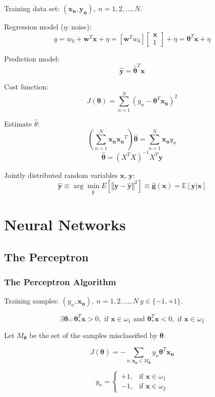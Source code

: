 \documentclass{report}
\begin{document}
Training data set: $(\symbf{x_n}, \symbf{y_n}),\ n=1, 2, \ldots, N$.

Regression model ($\eta$: noise):
\[y = w_0 + \symbf{w}^T \symbf{x} + \eta = [\symbf{w}^T w_0] \begin{bmatrix}\symbf{x} \\
1\end{bmatrix} + \eta = \symbf{\theta}^T \symbf{x} + \eta\]

Prediction model:
\[\symbf{\hat y} = \symbf{\hat \theta}^T \symbf{x}\]

Cost function:
\[J(\symbf{\theta}) = \sum_{n=1}^N (y_n - \symbf{\theta}^T \symbf{x_n})^2 \]

Estimate $\hat \theta$:
\[\left( \sum_{n=1}^N \symbf{x_n}\symbf{x_n}^T \right) \symbf{\hat \theta} = \sum_{n=1}^N \symbf{x_n} y_n\]
\[\symbf{\hat \theta} = (X^T X)^{-1} X^T \symbf{y}\]

Jointly distributed random variables $\symbf{x}$, $\symbf{y}$:
\[\symbf{\hat y} \equiv \arg\min_{\symbf{\hat y}} E\left[ \left\Vert \symbf{y} - \symbf{\hat y} \right\Vert^2 \right] \equiv \symbf{\hat g}(\symbf{x}) = \mathbb{E}[\symbf{y} | \symbf{x}]\]


\chapter{Neural Networks}

\section*{The Perceptron}

\subsection*{The Perceptron Algorithm}

Training samples: $(y_n, \symbf{x_n}),\ n=1, 2, \ldots, N\ y \in \{-1, +1\}$.

\[\exists \symbf{\theta}_*: \symbf{\theta}_*^T \symbf{x} > 0,\text{ if }\symbf{x} \in \omega_1\text{ and }\symbf{\theta}_*^T \symbf{x} < 0,\text{ if }\symbf{x} \in \omega_2\]

Let $M_{\symbf{\theta}}$ be the set of the samples misclassified by $\symbf{\theta}$.

\[J(\symbf{\theta}) = - \sum_{n: \symbf{x_n} \in M_{\symbf{\theta}}} y_n \symbf{\theta}^T \symbf{x_n}\]

\[y_n = \begin{cases}
	+1, & \text{if } \symbf{x} \in \omega_1 \\
	-1, & \text{if } \symbf{x} \in \omega_2
\end{cases}\]
\end{document}
